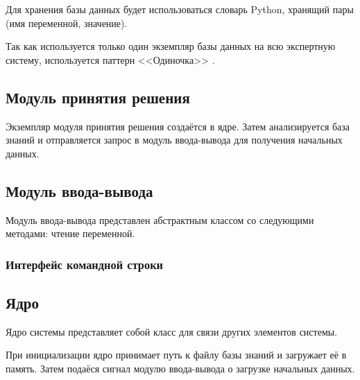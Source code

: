 Для хранения базы данных будет использоваться словарь Python, хранящий пары (имя переменной, значение).

Так как используется только один экземпляр базы данных на всю экспертную систему, используется паттерн <<Одиночка>> \cite{gammaDesignPatternsElements1995}.

\subsection{Модуль принятия решения}

Экземпляр модуля принятия решения создаётся в ядре.
Затем анализируется база знаний и отправляется запрос в модуль ввода-вывода для получения начальных данных.

\subsection{Модуль ввода-вывода}

Модуль ввода-вывода представлен абстрактным классом со следующими методами: чтение переменной.

\subsubsection{Интерфейс командной строки}

\subsection{Ядро}

Ядро системы представляет собой класс для связи других элементов системы.

При инициализации ядро принимает путь к файлу базы знаний и загружает её в память.
Затем подаёся сигнал модулю ввода-вывода о загрузке начальных данных.
